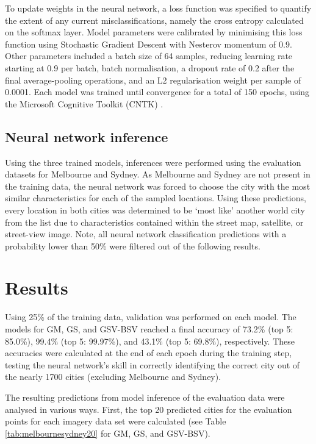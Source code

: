\documentclass[Crown,sageh,times]{sagej}
\begin{document}
To update weights in the neural network, a loss function was specified to quantify the extent of any current misclassifications, namely the cross entropy calculated on the softmax layer. Model parameters were calibrated by minimising this loss function using Stochastic Gradient Descent with Nesterov momentum of 0.9. Other parameters included a batch size of 64 samples, reducing learning rate starting at 0.9 per batch, batch normalisation, a dropout rate of 0.2 after the final average-pooling operations, and an L2 regularisation weight per sample of 0.0001. Each model was trained until convergence for a total of 150 epochs, using the Microsoft Cognitive Toolkit (CNTK) \citep{Yu2015}. 


\subsection{Neural network inference}\label{sec:methods5}    
Using the three trained models, inferences were performed using the evaluation datasets for Melbourne and Sydney. As Melbourne and Sydney are not present in the training data, the neural network was forced to choose the city with the most similar characteristics for each of the sampled locations. Using these predictions, every location in both cities was determined to be `most like' another world city from the list due to  characteristics contained within the street map, satellite, or street-view image. Note, all neural network classification predictions with a probability lower than 50\% were filtered out of the following results.



\section{Results}\label{sec:results}

Using 25\% of the training data, validation was performed on each model. The models for GM, GS, and GSV-BSV reached a final accuracy of 73.2\% (top 5: 85.0\%), 99.4\% (top 5: 99.97\%), and 43.1\% (top 5: 69.8\%), respectively. These accuracies were calculated at the end of each epoch during the training step, testing the neural network's skill in correctly identifying the correct city out of the nearly 1700 cities (excluding Melbourne and Sydney).


The resulting predictions from model inference of the evaluation data were analysed in various ways. First, the top 20 predicted cities for the evaluation points for each imagery data set were calculated (see Table \ref{tab:melbournesydney20} for GM, GS, and GSV-BSV).
\end{document}

